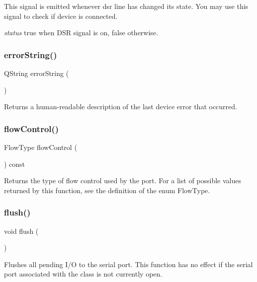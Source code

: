 This signal is emitted whenever dsr line has changed its state. You may use this signal to check if device is connected.

{\itshape status} true when D\+SR signal is on, false otherwise. \mbox{\label{class_qext_serial_port_af799a7684337babb971e2e0d8cda7cf1}} 
\subsubsection{\texorpdfstring{errorString()}{errorString()}}
{\footnotesize\ttfamily Q\+String error\+String (\begin{DoxyParamCaption}{ }\end{DoxyParamCaption})}

Returns a human-\/readable description of the last device error that occurred. \mbox{\label{class_qext_serial_port_a54adc33c948296a4fdfae02bca62a8a9}} 
\subsubsection{\texorpdfstring{flowControl()}{flowControl()}}
{\footnotesize\ttfamily Flow\+Type flow\+Control (\begin{DoxyParamCaption}{ }\end{DoxyParamCaption}) const}

Returns the type of flow control used by the port. For a list of possible values returned by this function, see the definition of the enum Flow\+Type. \mbox{\label{class_qext_serial_port_adac116554b543b7c4228c018a85882f5}} 
\subsubsection{\texorpdfstring{flush()}{flush()}}
{\footnotesize\ttfamily void flush (\begin{DoxyParamCaption}{ }\end{DoxyParamCaption})}

Flushes all pending I/O to the serial port. This function has no effect if the serial port associated with the class is not currently open. \mbox{\label{class_qext_serial_port_a4174ec4c484016e26eaea53edd252e26}} 

